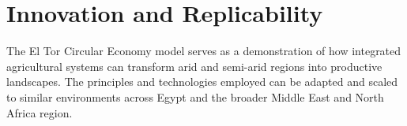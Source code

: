 \section{Innovation and Replicability}

The El Tor Circular Economy model serves as a demonstration of how integrated agricultural systems can transform arid and semi-arid regions into productive landscapes. The principles and technologies employed can be adapted and scaled to similar environments across Egypt and the broader Middle East and North Africa region.

